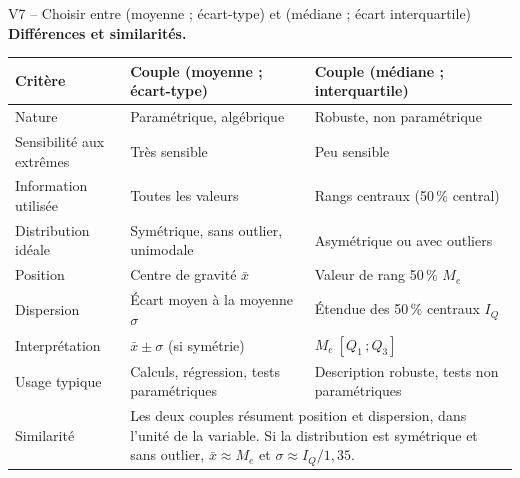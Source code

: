 \documentclass[11pt,a4paper]{article}
\begin{document}
\begin{vignetteCours}{V7 -- Choisir entre (moyenne ; écart-type) et (médiane ; écart interquartile)}
\medskip
\textbf{Différences et similarités.}
\begin{center}
\small
\renewcommand{\arraystretch}{1.25}
\begin{tabular}{|p{3.2cm}|p{5.4cm}|p{5.4cm}|}
\hline
\textbf{Critère} & \textbf{Couple (moyenne ; écart-type)} & \textbf{Couple (médiane ; interquartile)} \\
\hline
Nature & Paramétrique, algébrique & Robuste, non paramétrique \\
\hline
Sensibilité aux extrêmes & Très sensible & Peu sensible \\
\hline
Information utilisée & Toutes les valeurs & Rangs centraux (50\,\% central) \\
\hline
Distribution idéale & Symétrique, sans outlier, unimodale & Asymétrique ou avec outliers \\
\hline
Position & Centre de gravité $\bar{x}$ & Valeur de rang 50\,\% $M_e$ \\
\hline
Dispersion & Écart moyen à la moyenne $\sigma$ & Étendue des 50\,\% centraux $I_Q$ \\
\hline
Interprétation & $\bar{x} \pm \sigma$ (si symétrie) & $M_e\ [Q_1\,;Q_3]$ \\
\hline
Usage typique & Calculs, régression, tests paramétriques & Description robuste, tests non paramétriques \\
\hline
Similarité & \multicolumn{2}{p{10.8cm}|}{Les deux couples résument position et dispersion, dans l'unité de la variable. Si la distribution est symétrique et sans outlier, $\bar{x} \approx M_e$ et $\sigma \approx I_Q / 1{,}35$.} \\
\hline
\end{tabular}
\end{center}


\end{vignetteCours}
\end{document}

